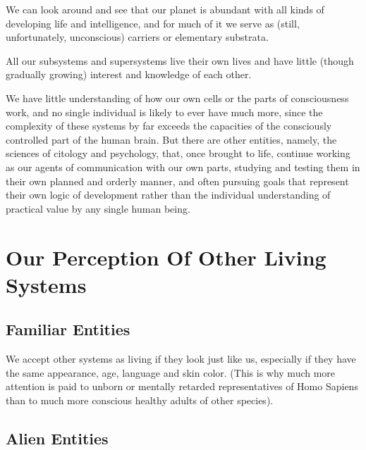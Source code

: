      We can look around and see that our planet is abundant  with  all
kinds of developing life and intelligence, and for much of it we serve
as  (still,  unfortunately,  unconscious)   carriers   or   elementary
substrata.

     All our subsystems and supersystems live their own lives and have
little  (though  gradually  growing)  interest  and  knowledge of each
other.

     We have little understanding of how our own cells or the parts of
consciousness  work,  and  no single individual is likely to ever have
much more, since the complexity of these systems by  far  exceeds  the
capacities of the consciously controlled part of the human brain.  But
there are  other  entities,  namely,  the  sciences  of  citology  and
psychology, that, once brought to life, continue working as our agents
of communication with our own parts,  studying  and  testing  them  in
their  own  planned  and orderly manner, and often pursuing goals that
represent their own logic of development rather  than  the  individual
understanding of practical value by any single human being.



\section{Our Perception Of Other Living Systems}

\subsection{Familiar Entities}

     We accept other systems as living if  they  look  just  like  us,
especially  if  they  have the same appearance, age, language and skin
color.  (This is why much more attention is paid to unborn or mentally
retarded  representatives  of Homo Sapiens than to much more conscious
healthy adults of other species).



\subsection{Alien Entities}

